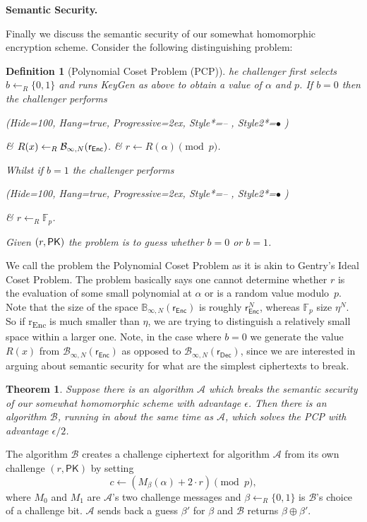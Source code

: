 \documentclass[a4paper, 12pt]{article}
\newtheorem{definition}{Definition}
\newtheorem{theorem}{Theorem}
\newenvironment{capsproof}[1][\proofname]{\proof[\scshape #1:]}{\endproof}
\newcommand{\bb}[1]{\mathbb{#1}}
\newcommand{\mc}[1]{\mathcal{#1}}
\newcommand{\tsf}[1]{\textsf{#1}}
\newcommand{\tbf}[1]{\textbf{#1}}
\newcommand{\tss}[1]{\textsubscript{#1}}
\newcommand*\xor{\mathbin{\oplus}}
\newenvironment{bparagraph}[1]{
	\vspace{2ex}\noindent\tbf{#1. }\nolinebreak 
}{}
\newenvironment{defaultlist}{
	\begin{easylist}
		\ListProperties(Hide=100, Hang=true, Progressive=2ex, Style*=-- , Style2*=$\bullet$ )
	}{\end{easylist}}
\begin{document}
	\begin{bparagraph}{Semantic Security}
		Finally we discuss the semantic security of our somewhat homomorphic encryption scheme. 
		Consider the following distinguishing problem:
		\begin{definition}[Polynomial Coset Problem (PCP)]
			he challenger first	selects $b \leftarrow _R \{0, 1\}$ and runs {\normalfont \tsf{KeyGen}} as above to obtain a value of $\alpha$ and $p$. If $b=0$ then the challenger performs
			\begin{defaultlist}
				& $R(x) \leftarrow _R \mc{B}_{\infty, N}({\normalfont \tsf{r}_\tsf{Enc}})$.
				& $r \leftarrow R(\alpha) \pmod{p}$.
			\end{defaultlist}
			\noindent
			Whilst if $b = 1$ the challenger performs
			\begin{defaultlist}
				& $r \leftarrow _R \bb{F}_p$.
			\end{defaultlist}
			\noindent
			Given ${\normalfont (r, \tsf{PK})}$ the problem is to guess whether $b=0$ or $b=1$.
		\end{definition}
		\noindent
		We call the problem the Polynomial Coset Problem as it is akin to Gentry's Ideal Coset Problem.
		The problem basically says one cannot determine	whether $r$ is the evaluation of some small polynomial at $\alpha$ or is a random value modulo~$p$.
		Note that the size of the space $\bb{B}_{\infty, N}(\tsf{r}_\tsf{Enc})$ is roughly $\tsf{r}_\tsf{Enc}^N$, whereas $\bb{F}_p$ size $\eta^N$. 
		So if \tsf{r\tss{Enc}} is much smaller than $\eta$, we are trying to distinguish a relatively small space within a larger one.
		Note, in the case where $b=0$ we generate the value $R(x)$ from $\mc{B}_{\infty, N}(\tsf{r}_\tsf{Enc})$ as opposed to $\mc{B}_{\infty, N}(\tsf{r}_\tsf{Dec})$, since we are interested in arguing about semantic security for what are the simplest ciphertexts to break.
		
		\begin{theorem}
			Suppose there is an algorithm $\mc{A}$ which breaks the semantic security of our somewhat homomorphic scheme with advantage $\epsilon$.
			Then there is an algorithm $\mc{B}$, running in about the same time as $\mc{A}$, which solves the PCP with advantage $\epsilon/2$.
		\end{theorem}
		
		\begin{capsproof}
			The algorithm $\mc{B}$ creates a challenge ciphertext for algorithm $\mc{A}$ from its own challenge $(r, \tsf{PK})$ by setting
			\[
				c \leftarrow (M_\beta(\alpha)+2 \cdot r) \pmod{p},
			\]
			where $M_0$ and $M_1$ are $\mc{A}$'s two challenge messages and $\beta \leftarrow _R \{0, 1\}$ is $\mc{B}$'s choice of a challenge bit. $\mc{A}$ sends back a guess $\beta '$ for $\beta$ and $\mc{B}$ returns $\beta \xor \beta '$.
			

\end{capsproof}
\end{bparagraph}
\end{document}
